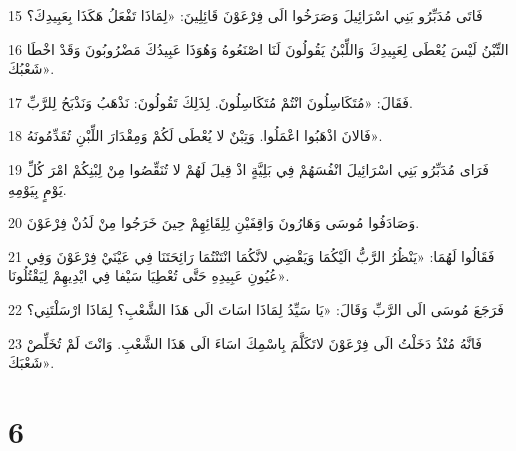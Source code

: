 \par 15 فَاتَى مُدَبِّرُو بَنِي اسْرَائِيلَ وَصَرَخُوا الَى فِرْعَوْنَ قَائِلِينَ: «لِمَاذَا تَفْعَلُ هَكَذَا بِعَبِيدِكَ؟
\par 16 التِّبْنُ لَيْسَ يُعْطَى لِعَبِيدِكَ وَاللِّبْنُ يَقُولُونَ لَنَا اصْنَعُوهُ وَهُوَذَا عَبِيدُكَ مَضْرُوبُونَ وَقَدْ اخْطَا شَعْبُكَ».
\par 17 فَقَالَ: «مُتَكَاسِلُونَ انْتُمْ مُتَكَاسِلُونَ. لِذَلِكَ تَقُولُونَ: نَذْهَبُ وَنَذْبَحُ لِلرَّبِّ.
\par 18 فَالانَ اذْهَبُوا اعْمَلُوا. وَتِبْنٌ لا يُعْطَى لَكُمْ وَمِقْدَارَ اللِّبْنِ تُقَدِّمُونَهُ».
\par 19 فَرَاى مُدَبِّرُو بَنِي اسْرَائِيلَ انْفُسَهُمْ فِي بَلِيَّةٍ اذْ قِيلَ لَهُمْ لا تُنَقِّصُوا مِنْ لِبْنِكُمْ امْرَ كُلِّ يَوْمٍ بِيَوْمِهِ.
\par 20 وَصَادَفُوا مُوسَى وَهَارُونَ وَاقِفَيْنِ لِلِقَائِهِمْ حِينَ خَرَجُوا مِنْ لَدُنْ فِرْعَوْنَ.
\par 21 فَقَالُوا لَهُمَا: «يَنْظُرُ الرَّبُّ الَيْكُمَا وَيَقْضِي لانَّكُمَا انْتَنْتُمَا رَائِحَتَنَا فِي عَيْنَيْ فِرْعَوْنَ وَفِي عُيُونِ عَبِيدِهِ حَتَّى تُعْطِيَا سَيْفا فِي ايْدِيهِمْ لِيَقْتُلُونَا».
\par 22 فَرَجَعَ مُوسَى الَى الرَّبِّ وَقَالَ: «يَا سَيِّدُ لِمَاذَا اسَاتَ الَى هَذَا الشَّعْبِ؟ لِمَاذَا ارْسَلْتَنِي؟
\par 23 فَانَّهُ مُنْذُ دَخَلْتُ الَى فِرْعَوْنَ لاتَكَلَّمَ بِاسْمِكَ اسَاءَ الَى هَذَا الشَّعْبِ. وَانْتَ لَمْ تُخَلِّصْ شَعْبَكَ».

\chapter{6}

